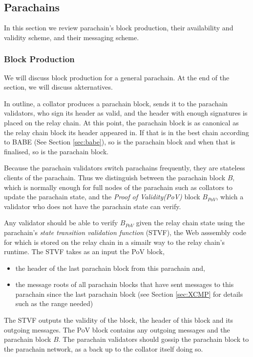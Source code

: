 \subsection{Parachains}\label{sec:parachains}
In this section we review parachain's block production, their availability and validity scheme, and their messaging scheme.
\subsubsection{Block Production}\label{sec:parachainblockproduction}

We will discuss block production for a general parachain. At the end of the section, we will discuss akternatives.

In outline, a collator produces a parachain block, sends it to the parachain validators,
who sign its header as valid, and the header with enough signatures is placed on the relay chain.
At this point, the parachain block is as canonical as the relay chain block its header appeared in.
If that is in the best chain according to BABE (See Section \ref{sec:babe}), so is the parachain block and when that is finalised, so is the parachain block.

Because the parachain validators switch parachains frequently, they are stateless clients of the parachain.
Thus we distinguish between the parachain block $B$, which is normally enough for full nodes of the parachain such as collators to update the parachain state,
and the {\em Proof of Validity(PoV)} block $B_{PoV}$, which a validator who does not have the parachain state can verify.

Any validator should be able to verify $B_{PoV}$ given the relay chain state using the parachain's {\em state transition validation function} (STVF),
the Web asssembly code for which is stored on the relay chain in a simailr way to the relay chain's runtime.
The STVF takes as an input the PoV block,
\begin{itemize}
	\item  the header of the last parachain block from this parachain and,
	\item the message roots of all parachain blocks that have sent messages to this parachain since the last parachain block
	(see Section \ref{sec:XCMP} for details such as the range needed)
\end{itemize}
The STVF outputs the validity of the block, the header of this block and its outgoing messages.
The PoV block contains any outgoing messages and the parachain block $B$. The parachain validators should gossip the parachain block to the parachain network, as a back up to the collator itself doing so.

